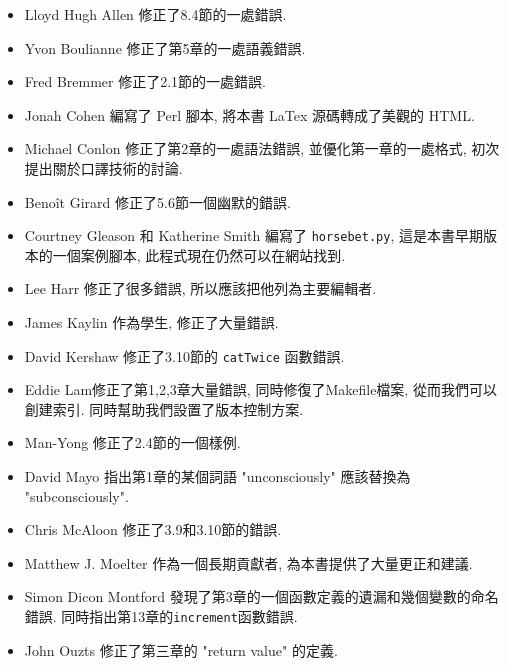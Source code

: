 \documentclass[10pt]{book}
\begin{document}
\begin{itemize}

\small
\item Lloyd Hugh Allen 修正了8.4節的一處錯誤. 

\item Yvon Boulianne 修正了第5章的一處語義錯誤. 

\item Fred Bremmer 修正了2.1節的一處錯誤. 

\item Jonah Cohen 編寫了 Perl 腳本, 將本書 LaTex 源碼轉成了美觀的 HTML. 

\item Michael Conlon 修正了第2章的一處語法錯誤, 並優化第一章的一處格式, 
初次提出關於口譯技術的討論. 

\item Beno\^{i}t Girard 修正了5.6節一個幽默的錯誤. 

\item Courtney Gleason 和 Katherine Smith 編寫了 {\tt horsebet.py}, 
這是本書早期版本的一個案例腳本, 此程式現在仍然可以在網站找到. 

\item Lee Harr 修正了很多錯誤, 所以應該把他列為主要編輯者. 

\item James Kaylin 作為學生, 修正了大量錯誤. 

\item David Kershaw 修正了3.10節的 {\tt catTwice} 函數錯誤. 

\item Eddie Lam修正了第1,2,3章大量錯誤, 同時修復了Makefile檔案, 
從而我們可以創建索引. 同時幫助我們設置了版本控制方案. 

\item Man-Yong 修正了2.4節的一個樣例. 

\item David Mayo 指出第1章的某個詞語 "unconsciously"
應該替換為 "subconsciously".

\item Chris McAloon 修正了3.9和3.10節的錯誤. 

\item Matthew J. Moelter 作為一個長期貢獻者, 為本書提供了大量更正和建議. 

\item Simon Dicon Montford 發現了第3章的一個函數定義的遺漏和幾個變數的命名錯誤. 
同時指出第13章的{\tt increment}函數錯誤. 

\item John Ouzts 修正了第三章的 "return value" 的定義. 


\end{itemize}
\end{document}
